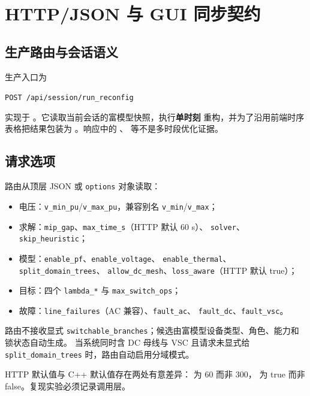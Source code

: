 
\section{HTTP/JSON 与 GUI 同步契约}\label{sec:nr-http}

\subsection{生产路由与会话语义}

生产入口为
\begin{center}
\texttt{POST /api/session/run\_reconfig}
\end{center}
实现于 。它读取当前会话的富模型快照，执行\textbf{单时刻}
重构，并为了沿用前端时序表格把结果包装为 。响应中的
、 等不是多时段优化证据。

\subsection{请求选项}

路由从顶层 JSON 或 \texttt{options} 对象读取：
\begin{itemize}
  \item 电压：\texttt{v\_min\_pu}/\texttt{v\_max\_pu}，兼容别名
        \texttt{v\_min}/\texttt{v\_max}；
  \item 求解：\texttt{mip\_gap}、\texttt{max\_time\_s}（HTTP 默认 60 s）、
        \texttt{solver}、\texttt{skip\_heuristic}；
  \item 模型：\texttt{enable\_pf}、\texttt{enable\_voltage}、
        \texttt{enable\_thermal}、\texttt{split\_domain\_trees}、
        \texttt{allow\_dc\_mesh}、\texttt{loss\_aware}（HTTP 默认 true）；
  \item 目标：四个 \texttt{lambda\_*} 与 \texttt{max\_switch\_ops}；
  \item 故障：\texttt{line\_failures}（AC 兼容）、\texttt{fault\_ac}、
        \texttt{fault\_dc}、\texttt{fault\_vsc}。
\end{itemize}
路由不接收显式 \texttt{switchable\_branches}；候选由富模型设备类型、角色、能力和锁状态自动生成。
当系统同时含 DC 母线与 VSC 且请求未显式给 \texttt{split\_domain\_trees} 时，路由自动启用分域模式。

HTTP 默认值与 C++ 默认值存在两处有意差异： 为 60 而非 300，
 为 true 而非 false。复现实验必须记录调用层。

